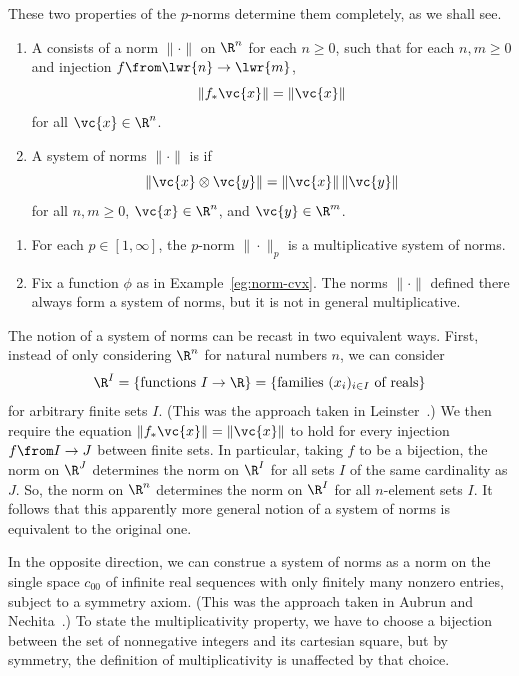 These two properties of the $p$-norms determine them completely, as we
shall see.

\begin{defn}
\begin{enumerate}
\item 
{}
A  consists of a norm $\|\cdot\|$ on $\R^n$ for each
$n \geq 0$, such that for each $n, m \geq 0$ and injection $f \from \lwr{n}
\to \lwr{m}$,
\[
\|f_*\vc{x}\| = \|\vc{x}\|
\]
for all $\vc{x} \in \R^n$.

\item
A system of norms $\|\cdot\|$ is %
%
% 
if 
\[
\|\vc{x} \otimes \vc{y}\| = \|\vc{x}\| \, \|\vc{y}\|
\]
for all $n, m \geq 0$, $\vc{x} \in \R^n$, and $\vc{y} \in \R^m$.  
\end{enumerate}
\end{defn}

\begin{examples}
\begin{enumerate}
\item 
For each $p \in [1, \infty]$, the $p$-norm $\|\cdot\|_p$ is a
multiplicative system of norms.

\item
Fix a function $\phi$ as in Example~\ref{eg:norm-cvx}.  The norms
$\|\cdot\|$ defined there always form a system of norms, but it is not in
general multiplicative.
\end{enumerate}
\end{examples}

\begin{remark}
The notion of a system of norms can be recast in two equivalent ways.  
First, instead of only considering $\R^n$ for natural numbers $n$, we can
consider
\[
\R^I 
=
\{ \text{functions } I \to \R \}
=
\{ \text{families } (x_i)_{i \in I} \text{ of reals} \}
\]
for arbitrary finite sets $I$.  (This was the approach taken in
Leinster~\cite{MCPM}.)  We then require the equation $\|f_* \vc{x}\| =
\|\vc{x}\|$ to hold for every injection $f \from I \to J$ between finite
sets.  In particular, taking $f$ to be a bijection, the norm on $\R^J$
determines the norm on $\R^I$ for all sets $I$ of the same cardinality as
$J$.  So, the norm on $\R^n$ determines the norm on $\R^I$ for all
$n$-element sets $I$.  It follows that this apparently more general notion
of a system of norms is equivalent to the original one.

In the opposite direction, we can construe a system of norms as a norm on
the single space $c_{00}$ of infinite real sequences with only finitely
many nonzero entries, subject to a symmetry axiom.  (This was the approach
taken in Aubrun and Nechita~\cite{AuNe}.)  To state the multiplicativity
property, we have to choose a bijection between the set of nonnegative
integers and its cartesian square, but by symmetry, the definition of
multiplicativity is unaffected by that choice.
\end{remark}

